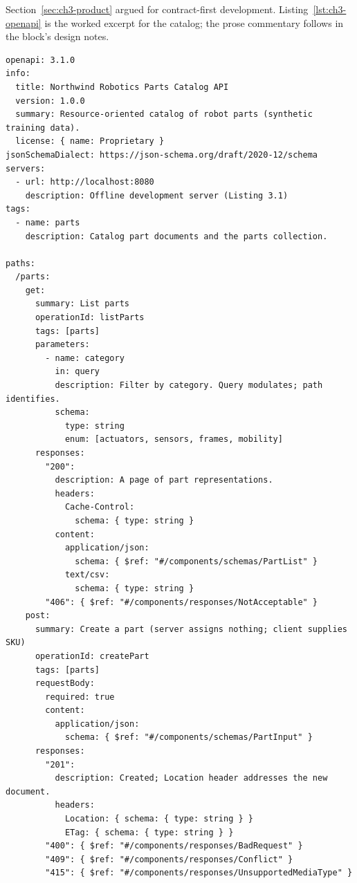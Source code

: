 Section~\ref{sec:ch3-product} argued for contract-first development.
Listing~\ref{lst:ch3-openapi} is the worked excerpt for the catalog; the prose
commentary follows in the block's design notes.

\begin{verbatim}
openapi: 3.1.0
info:
  title: Northwind Robotics Parts Catalog API
  version: 1.0.0
  summary: Resource-oriented catalog of robot parts (synthetic training data).
  license: { name: Proprietary }
jsonSchemaDialect: https://json-schema.org/draft/2020-12/schema
servers:
  - url: http://localhost:8080
    description: Offline development server (Listing 3.1)
tags:
  - name: parts
    description: Catalog part documents and the parts collection.

paths:
  /parts:
    get:
      summary: List parts
      operationId: listParts
      tags: [parts]
      parameters:
        - name: category
          in: query
          description: Filter by category. Query modulates; path identifies.
          schema:
            type: string
            enum: [actuators, sensors, frames, mobility]
      responses:
        "200":
          description: A page of part representations.
          headers:
            Cache-Control:
              schema: { type: string }
          content:
            application/json:
              schema: { $ref: "#/components/schemas/PartList" }
            text/csv:
              schema: { type: string }
        "406": { $ref: "#/components/responses/NotAcceptable" }
    post:
      summary: Create a part (server assigns nothing; client supplies SKU)
      operationId: createPart
      tags: [parts]
      requestBody:
        required: true
        content:
          application/json:
            schema: { $ref: "#/components/schemas/PartInput" }
      responses:
        "201":
          description: Created; Location header addresses the new document.
          headers:
            Location: { schema: { type: string } }
            ETag: { schema: { type: string } }
        "400": { $ref: "#/components/responses/BadRequest" }
        "409": { $ref: "#/components/responses/Conflict" }
        "415": { $ref: "#/components/responses/UnsupportedMediaType" }


\end{verbatim}
